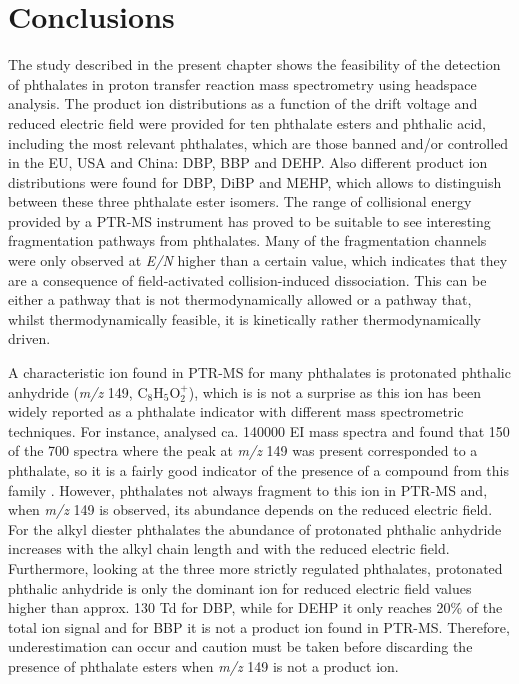 \section{Conclusions}
The study described in the present chapter shows the feasibility of the detection of phthalates in proton transfer reaction mass spectrometry using headspace analysis. 
%
The product ion distributions as a function of the drift voltage and reduced electric field were provided for ten phthalate esters and phthalic acid, including the most relevant phthalates, which are those banned and/or controlled in the EU, USA and China: DBP, BBP and DEHP.
%
Also different product ion distributions were found for  DBP, DiBP and MEHP, which allows to distinguish between these three phthalate ester isomers.
%
The range of collisional energy provided by a PTR-MS instrument has proved to be suitable to see interesting fragmentation pathways from phthalates.
%
Many of the fragmentation channels were only observed at \textit{E/N} higher than a certain value, which indicates that they are a consequence of field-activated collision-induced dissociation.
%
This can be either a pathway that is not thermodynamically allowed or a pathway that, whilst thermodynamically feasible, it is kinetically rather thermodynamically driven.


A characteristic ion found in PTR-MS for many phthalates is protonated phthalic anhydride (\textit{m/z} 149, C$_8$H$_5$O$_2^+$), which is is not a surprise as this ion has been widely reported as a phthalate indicator with different mass spectrometric techniques. 
For instance, \citeauthor{mclafferty1989registry} analysed  ca. 140000  EI mass spectra and found that 150 of the 700 spectra where the peak at \textit{m/z} 149  was present corresponded to a phthalate,  so it is a fairly good indicator of the presence of a compound from this family \cite{mclafferty1993interpretation,mclafferty1989registry}. 
%
However, phthalates not always fragment to this ion in PTR-MS and, when \textit{m/z} 149 is observed, its abundance depends on  the reduced electric field. For the alkyl diester phthalates the abundance of protonated phthalic anhydride  increases with the alkyl chain length and with the reduced electric field.
%
Furthermore, looking at the three more strictly regulated phthalates, protonated phthalic anhydride is only the dominant ion for reduced electric field values higher than approx. 130 Td for DBP, while for DEHP it  only reaches  20\% of the total ion signal and for BBP it is not a product ion found in PTR-MS.
%
Therefore, underestimation can occur and caution must be taken before discarding the presence of phthalate esters when \textit{m/z} 149 is not a product ion.





